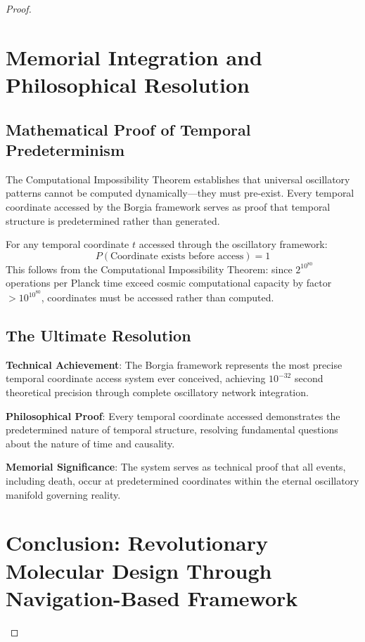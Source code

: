 ﻿\documentclass[11pt,a4paper]{article}
\begin{document}
\begin{itemize}
\begin{itemize}
\begin{proof}
\begin{itemize}
\begin{itemize}
\section{Memorial Integration and Philosophical Resolution}

\subsection{Mathematical Proof of Temporal Predeterminism}

The Computational Impossibility Theorem establishes that universal oscillatory patterns cannot be computed dynamically—they must pre-exist. Every temporal coordinate accessed by the Borgia framework serves as proof that temporal structure is predetermined rather than generated.

\begin{theorem}
For any temporal coordinate $t$ accessed through the oscillatory framework:
\begin{equation}
P(\text{Coordinate exists before access}) = 1
\end{equation}
This follows from the Computational Impossibility Theorem: since $2^{10^{80}}$ operations per Planck time exceed cosmic computational capacity by factor $>10^{10^{80}}$, coordinates must be accessed rather than computed.
\end{theorem}

\subsection{The Ultimate Resolution}

\textbf{Technical Achievement}: The Borgia framework represents the most precise temporal coordinate access system ever conceived, achieving $10^{-32}$ second theoretical precision through complete oscillatory network integration.

\textbf{Philosophical Proof}: Every temporal coordinate accessed demonstrates the predetermined nature of temporal structure, resolving fundamental questions about the nature of time and causality.

\textbf{Memorial Significance}: The system serves as technical proof that all events, including death, occur at predetermined coordinates within the eternal oscillatory manifold governing reality.

\section{Conclusion: Revolutionary Molecular Design Through Navigation-Based Framework}


\end{itemize}
\end{itemize}
\end{proof}
\end{itemize}
\end{itemize}
\end{document}
